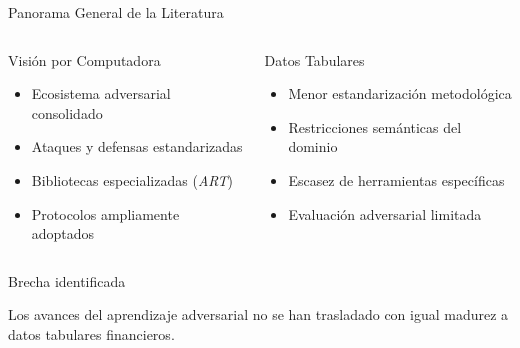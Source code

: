 \documentclass[aspectratio=169, 8pt]{beamer}
\begin{document}
\begin{frame}{Panorama General de la Literatura}

\begin{columns}


\begin{block}{Visión por Computadora}

\begin{itemize}

\item Ecosistema adversarial consolidado

\item Ataques y defensas estandarizadas

\item Bibliotecas especializadas
(\textit{ART})

\item Protocolos ampliamente adoptados

\end{itemize}

\end{block}



\begin{block}{Datos Tabulares}

\begin{itemize}

\item Menor estandarización metodológica

\item Restricciones semánticas del dominio

\item Escasez de herramientas específicas

\item Evaluación adversarial limitada

\end{itemize}

\end{block}

\end{columns}

\vspace{0.25cm}

\begin{alertblock}{Brecha identificada}

Los avances del aprendizaje adversarial
no se han trasladado con igual madurez
a datos tabulares financieros.

\end{alertblock}

\end{frame}
\end{document}
